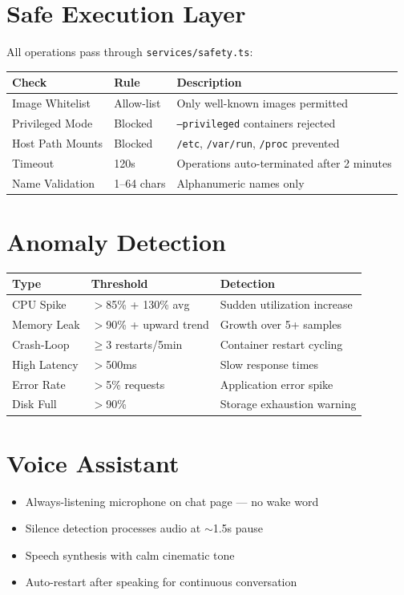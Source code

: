 \documentclass[12pt,a4paper]{report}
\begin{document}
\section{Safe Execution Layer}
All operations pass through \texttt{services/safety.ts}:
\begin{table}[H]
\centering
\small
\begin{tabularx}{\textwidth}{l l X}
\toprule
\textbf{Check} & \textbf{Rule} & \textbf{Description} \\
\midrule
Image Whitelist & Allow-list & Only well-known images permitted \\
Privileged Mode & Blocked & \texttt{--privileged} containers rejected \\
Host Path Mounts & Blocked & \texttt{/etc}, \texttt{/var/run}, \texttt{/proc} prevented \\
Timeout & 120s & Operations auto-terminated after 2 minutes \\
Name Validation & 1--64 chars & Alphanumeric names only \\
\bottomrule
\end{tabularx}
\end{table}

\section{Anomaly Detection}
\begin{table}[H]
\centering
\small
\begin{tabularx}{\textwidth}{l l X}
\toprule
\textbf{Type} & \textbf{Threshold} & \textbf{Detection} \\
\midrule
CPU Spike & $>$85\% + 130\% avg & Sudden utilization increase \\
Memory Leak & $>$90\% + upward trend & Growth over 5+ samples \\
Crash-Loop & $\geq$3 restarts/5min & Container restart cycling \\
High Latency & $>$500ms & Slow response times \\
Error Rate & $>$5\% requests & Application error spike \\
Disk Full & $>$90\% & Storage exhaustion warning \\
\bottomrule
\end{tabularx}
\end{table}

\section{Voice Assistant}
\begin{itemize}
  \item Always-listening microphone on chat page --- no wake word
  \item Silence detection processes audio at $\sim$1.5s pause
  \item Speech synthesis with calm cinematic tone
  \item Auto-restart after speaking for continuous conversation
\end{itemize}
\end{document}
